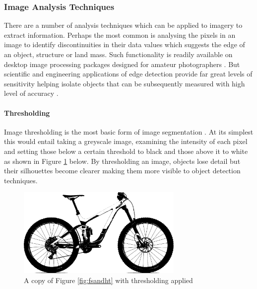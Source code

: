\subsubsection{Image Analysis Techniques}
	There are a number of analysis techniques which can be applied to imagery to extract information. Perhaps the most common is analysing the pixels in an image to identify discontinuities in their data values which suggests the edge of an object, structure or land mass. Such functionality is readily available on desktop image processing packages designed for amateur photographers \citep{photoshop}. But scientific and engineering applications of edge detection provide far great levels of sensitivity helping isolate objects that can be subsequently measured with high level of accuracy \citep{matlabedge}.
	\paragraph{Thresholding}
		Image thresholding is the most basic form of image segmentation \citep{haralock1991computer}. At its simplest this would entail taking a greyscale image, examining the intensity of each pixel and setting those below a certain threshold to black and those above it to white as shown in Figure \ref{fig:threshold} below. By thresholding an image, objects lose detail but their silhouettes become clearer making them more visible to object detection techniques.
		\begin{figure}[h!]
			\centering
			\includegraphics[width=8cm]{../images/reign_threshold.jpg}
			\caption{A copy of Figure \ref{fig:fsandht} with thresholding applied}
			\label{fig:threshold}
		\end{figure}
